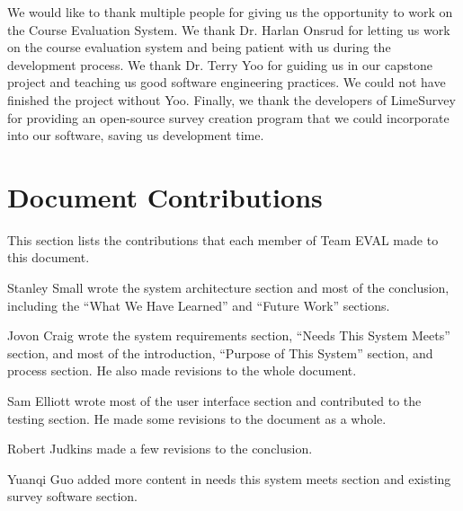 \documentclass{article}
\begin{document}
We would like to thank multiple people for giving us the opportunity to work on the Course Evaluation System. We thank Dr. Harlan Onsrud for letting us work on the course evaluation system and being patient with us during the development process. We thank Dr. Terry Yoo for guiding us in our capstone project and teaching us good software engineering practices. We could not have finished the project without Yoo. Finally, we thank the developers of LimeSurvey for providing an open-source survey creation program that we could incorporate into our software, saving us development time.

\newpage
\appendix

\section{Document Contributions}

This section lists the contributions that each member of Team EVAL made to this document.

\medskip

Stanley Small wrote the system architecture section and most of the conclusion, including the ``What We Have Learned'' and ``Future Work'' sections.

Jovon Craig wrote the system requirements section, ``Needs This System Meets'' section, and most of the introduction, ``Purpose of This System'' section, and process section. He also made revisions to the whole document.

Sam Elliott wrote most of the user interface section and contributed to the testing section. He made some revisions to the document as a whole.

Robert Judkins made a few revisions to the conclusion.

Yuanqi Guo added more content in needs this system meets section and existing survey software section. 
\end{document}
